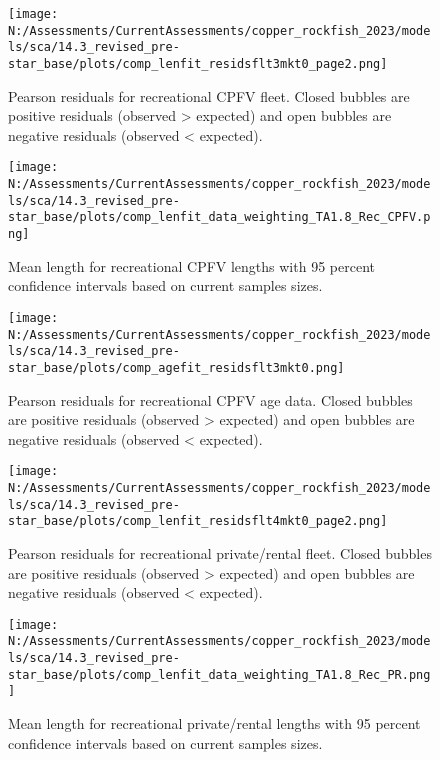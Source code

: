 \documentclass[11pt,
  english,
  letterpaper,
]{article}
\begin{document}
\pagebreak

\begin{figure}
\centering
\texttt{[image: N:/Assessments/CurrentAssessments/copper\_rockfish\_2023/models/sca/14.3\_revised\_pre-star\_base/plots/comp\_lenfit\_residsflt3mkt0\_page2.png]}
\caption{Pearson residuals for recreational CPFV fleet. Closed bubbles are positive residuals (observed \textgreater{} expected) and open bubbles are negative residuals (observed \textless{} expected).\label{fig:rec-cpfv-pearson}}
\end{figure}

\pagebreak

\begin{figure}
\centering
\texttt{[image: N:/Assessments/CurrentAssessments/copper\_rockfish\_2023/models/sca/14.3\_revised\_pre-star\_base/plots/comp\_lenfit\_data\_weighting\_TA1.8\_Rec\_CPFV.png]}
\caption{Mean length for recreational CPFV lengths with 95 percent confidence intervals based on current samples sizes.\label{fig:rec-cpfv-mean-len-fit}}
\end{figure}

\pagebreak

\begin{figure}
\centering
\texttt{[image: N:/Assessments/CurrentAssessments/copper\_rockfish\_2023/models/sca/14.3\_revised\_pre-star\_base/plots/comp\_agefit\_residsflt3mkt0.png]}
\caption{Pearson residuals for recreational CPFV age data. Closed bubbles are positive residuals (observed \textgreater{} expected) and open bubbles are negative residuals (observed \textless{} expected).\label{fig:rec-cpfv-age-pearson}}
\end{figure}

\pagebreak

\begin{figure}
\centering
\texttt{[image: N:/Assessments/CurrentAssessments/copper\_rockfish\_2023/models/sca/14.3\_revised\_pre-star\_base/plots/comp\_lenfit\_residsflt4mkt0\_page2.png]}
\caption{Pearson residuals for recreational private/rental fleet. Closed bubbles are positive residuals (observed \textgreater{} expected) and open bubbles are negative residuals (observed \textless{} expected).\label{fig:rec-pr-pearson}}
\end{figure}

\pagebreak

\begin{figure}
\centering
\texttt{[image: N:/Assessments/CurrentAssessments/copper\_rockfish\_2023/models/sca/14.3\_revised\_pre-star\_base/plots/comp\_lenfit\_data\_weighting\_TA1.8\_Rec\_PR.png]}
\caption{Mean length for recreational private/rental lengths with 95 percent confidence intervals based on current samples sizes.\label{fig:rec-pr-mean-len-fit}}
\end{figure}
\end{document}
